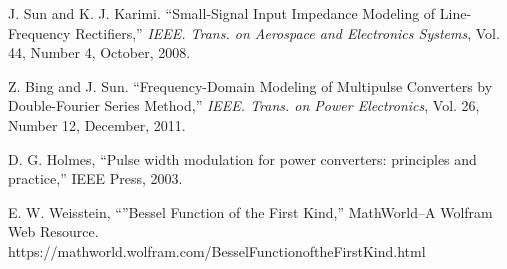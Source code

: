 \documentclass{article}
\begin{document}



\newpage



\begin{thebibliography}{1}


J. Sun and K. J. Karimi. ``Small-Signal Input Impedance Modeling of Line-Frequency Rectifiers,'' \emph{IEEE. Trans. on Aerospace and Electronics Systems}, Vol. 44, Number 4, October, 2008.

Z. Bing and J. Sun. ``Frequency-Domain Modeling of Multipulse Converters by Double-Fourier Series Method,'' \emph{IEEE. Trans. on Power Electronics}, Vol. 26, Number 12, December, 2011.

D. G. Holmes, ``Pulse width modulation for power converters: principles and practice,'' IEEE Press, 2003.


 E. W. Weisstein, ``''Bessel Function of the First Kind,'' MathWorld--A Wolfram Web Resource. https://mathworld.wolfram.com/BesselFunctionoftheFirstKind.html 



\end{thebibliography}
\end{document}
